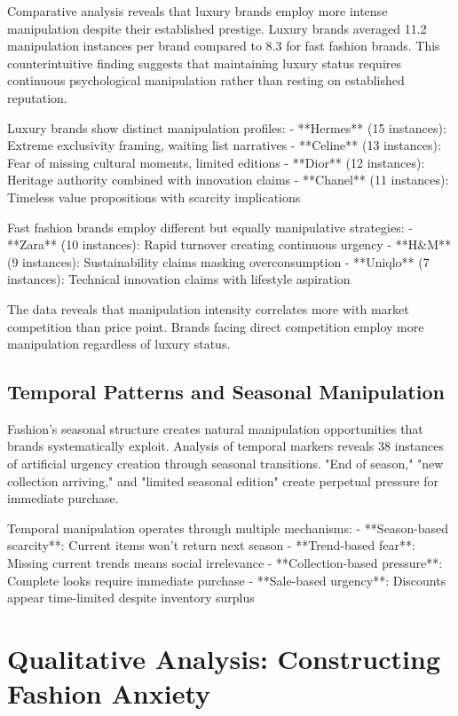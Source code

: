 Comparative analysis reveals that luxury brands employ more intense manipulation despite their established prestige. Luxury brands averaged 11.2 manipulation instances per brand compared to 8.3 for fast fashion brands. This counterintuitive finding suggests that maintaining luxury status requires continuous psychological manipulation rather than resting on established reputation.

Luxury brands show distinct manipulation profiles:
- **Hermes** (15 instances): Extreme exclusivity framing, waiting list narratives
- **Celine** (13 instances): Fear of missing cultural moments, limited editions
- **Dior** (12 instances): Heritage authority combined with innovation claims
- **Chanel** (11 instances): Timeless value propositions with scarcity implications

Fast fashion brands employ different but equally manipulative strategies:
- **Zara** (10 instances): Rapid turnover creating continuous urgency
- **H&M** (9 instances): Sustainability claims masking overconsumption
- **Uniqlo** (7 instances): Technical innovation claims with lifestyle aspiration

The data reveals that manipulation intensity correlates more with market competition than price point. Brands facing direct competition employ more manipulation regardless of luxury status.

\subsection{Temporal Patterns and Seasonal Manipulation}

Fashion's seasonal structure creates natural manipulation opportunities that brands systematically exploit. Analysis of temporal markers reveals 38 instances of artificial urgency creation through seasonal transitions. "End of season," "new collection arriving," and "limited seasonal edition" create perpetual pressure for immediate purchase.

Temporal manipulation operates through multiple mechanisms:
- **Season-based scarcity**: Current items won't return next season
- **Trend-based fear**: Missing current trends means social irrelevance
- **Collection-based pressure**: Complete looks require immediate purchase
- **Sale-based urgency**: Discounts appear time-limited despite inventory surplus

\section{Qualitative Analysis: Constructing Fashion Anxiety}
\label{sec:fashion_qual}

